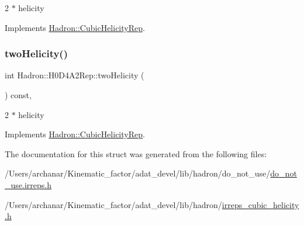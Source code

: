 2 $\ast$ helicity 

Implements \mbox{\hyperlink{structHadron_1_1CubicHelicityRep_af507aa56fc2747eacc8cb6c96db31ecc}{Hadron\+::\+Cubic\+Helicity\+Rep}}.

\mbox{\label{structHadron_1_1H0D4A2Rep_a578e119705a5020872b1e872705ac47e}} 
\subsubsection{\texorpdfstring{twoHelicity()}{twoHelicity()}\hspace{0.1cm}{\footnotesize\ttfamily [2/2]}}
{\footnotesize\ttfamily int Hadron\+::\+H0\+D4\+A2\+Rep\+::two\+Helicity (\begin{DoxyParamCaption}{ }\end{DoxyParamCaption}) const\hspace{0.3cm}{\ttfamily [inline]}, {\ttfamily [virtual]}}

2 $\ast$ helicity 

Implements \mbox{\hyperlink{structHadron_1_1CubicHelicityRep_af507aa56fc2747eacc8cb6c96db31ecc}{Hadron\+::\+Cubic\+Helicity\+Rep}}.



The documentation for this struct was generated from the following files\+:\begin{DoxyCompactItemize}
\item 
/\+Users/archanar/\+Kinematic\+\_\+factor/adat\+\_\+devel/lib/hadron/do\+\_\+not\+\_\+use/\mbox{\hyperlink{do__not__use_8irreps_8h}{do\+\_\+not\+\_\+use.\+irreps.\+h}}\item 
/\+Users/archanar/\+Kinematic\+\_\+factor/adat\+\_\+devel/lib/hadron/\mbox{\hyperlink{lib_2hadron_2irreps__cubic__helicity_8h}{irreps\+\_\+cubic\+\_\+helicity.\+h}}\end{DoxyCompactItemize}
